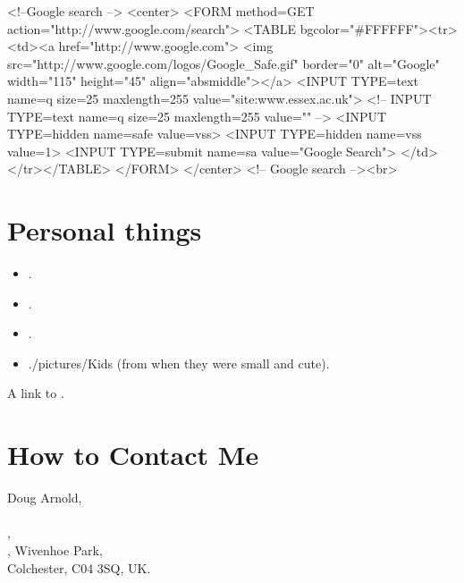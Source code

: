 \documentclass[a4paper]{article}
\begin{document}
\begin{rawxml}
<!--Google search -->
<center>
<FORM method=GET action="http://www.google.com/search">
<TABLE bgcolor="#FFFFFF"><tr><td><a href="http://www.google.com">
<img src="http://www.google.com/logos/Google_Safe.gif" border="0"
alt="Google" width="115" height="45" align="absmiddle"></a>
<INPUT TYPE=text name=q size=25 maxlength=255 value="site:www.essex.ac.uk">
<!-- INPUT TYPE=text name=q size=25 maxlength=255 value="" -->
<INPUT TYPE=hidden name=safe value=vss>
<INPUT TYPE=hidden name=vss value=1>
<INPUT TYPE=submit name=sa value="Google Search">
</td></tr></TABLE>
</FORM>
</center>
<!-- Google search --><br>
\end{rawxml}

\section{Personal things}

\begin{itemize}

\item {}.
\item {}.
\item {}.
\item {}
            {./pictures/Kids} (from when they were small and cute).

\end{itemize}

A link to .


\section{How to Contact Me}

Doug Arnold,\\
\\
,\\
,
Wivenhoe Park,\\
Colchester, C04 3SQ, UK.\\
\end{document}
